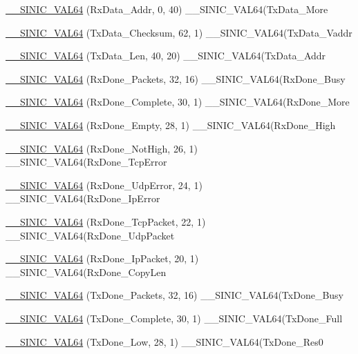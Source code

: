 \begin{DoxyCompactItemize}
\item 
\hyperlink{namespaceSinic_1_1Regs_a254e210bd0514c52c4201fce02fbde37}{\_\-\_\-SINIC\_\-VAL64} (RxData\_\-Addr, 0, 40) \_\-\_\-SINIC\_\-VAL64(TxData\_\-More
\item 
\hyperlink{namespaceSinic_1_1Regs_a71e5336091cc0a002be6ddca4170f242}{\_\-\_\-SINIC\_\-VAL64} (TxData\_\-Checksum, 62, 1) \_\-\_\-SINIC\_\-VAL64(TxData\_\-Vaddr
\item 
\hyperlink{namespaceSinic_1_1Regs_aec2513afaf1ae9c58b736480c3219f56}{\_\-\_\-SINIC\_\-VAL64} (TxData\_\-Len, 40, 20) \_\-\_\-SINIC\_\-VAL64(TxData\_\-Addr
\item 
\hyperlink{namespaceSinic_1_1Regs_a3bc0e3717e900c96e4f8aace95a88ef0}{\_\-\_\-SINIC\_\-VAL64} (RxDone\_\-Packets, 32, 16) \_\-\_\-SINIC\_\-VAL64(RxDone\_\-Busy
\item 
\hyperlink{namespaceSinic_1_1Regs_ac2d50c9bbacebbb88c7e3ce8f5bfe332}{\_\-\_\-SINIC\_\-VAL64} (RxDone\_\-Complete, 30, 1) \_\-\_\-SINIC\_\-VAL64(RxDone\_\-More
\item 
\hyperlink{namespaceSinic_1_1Regs_aa4d447d12bad07ba3285284641f0b9bd}{\_\-\_\-SINIC\_\-VAL64} (RxDone\_\-Empty, 28, 1) \_\-\_\-SINIC\_\-VAL64(RxDone\_\-High
\item 
\hyperlink{namespaceSinic_1_1Regs_af182b1b9bf70733427ca5de5c279065a}{\_\-\_\-SINIC\_\-VAL64} (RxDone\_\-NotHigh, 26, 1) \_\-\_\-SINIC\_\-VAL64(RxDone\_\-TcpError
\item 
\hyperlink{namespaceSinic_1_1Regs_acd705231133b1770ca6bb2832b91c188}{\_\-\_\-SINIC\_\-VAL64} (RxDone\_\-UdpError, 24, 1) \_\-\_\-SINIC\_\-VAL64(RxDone\_\-IpError
\item 
\hyperlink{namespaceSinic_1_1Regs_a9dfc142d1cf5dd6b3e90c3ce59473f0e}{\_\-\_\-SINIC\_\-VAL64} (RxDone\_\-TcpPacket, 22, 1) \_\-\_\-SINIC\_\-VAL64(RxDone\_\-UdpPacket
\item 
\hyperlink{namespaceSinic_1_1Regs_a644ca1227abc29d02e3bb265b2da3d6a}{\_\-\_\-SINIC\_\-VAL64} (RxDone\_\-IpPacket, 20, 1) \_\-\_\-SINIC\_\-VAL64(RxDone\_\-CopyLen
\item 
\hyperlink{namespaceSinic_1_1Regs_a2471d15988da51d14d87e98543cb61d5}{\_\-\_\-SINIC\_\-VAL64} (TxDone\_\-Packets, 32, 16) \_\-\_\-SINIC\_\-VAL64(TxDone\_\-Busy
\item 
\hyperlink{namespaceSinic_1_1Regs_a9fb08f4dcf913c94b9c8e4d93da6343a}{\_\-\_\-SINIC\_\-VAL64} (TxDone\_\-Complete, 30, 1) \_\-\_\-SINIC\_\-VAL64(TxDone\_\-Full
\item 
\hyperlink{namespaceSinic_1_1Regs_a42a2d957bef61bfe83e833f88dcb925b}{\_\-\_\-SINIC\_\-VAL64} (TxDone\_\-Low, 28, 1) \_\-\_\-SINIC\_\-VAL64(TxDone\_\-Res0

\end{DoxyCompactItemize}
